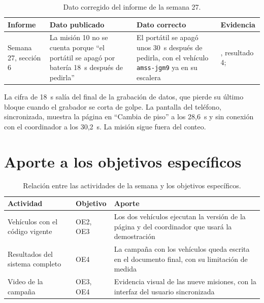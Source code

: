 \documentclass[12pt,letterpaper]{article}
\begin{document}
\begin{table}[H]
\centering
\small
\caption{Dato corregido del informe de la semana 27.}
\begin{tabular}{@{}p{2.2cm}p{4.6cm}p{4.6cm}p{3.2cm}@{}}
\toprule
\textbf{Informe} & \textbf{Dato publicado} & \textbf{Dato correcto} & \textbf{Evidencia} \\ \midrule
Semana 27, sección 6 & La misión 10 no se cuenta porque ``el portátil se apagó por batería 18~s después de pedirla'' & El portátil se apagó unos 30~s después de pedirla, con el vehículo \texttt{amss-jgm9} ya en su escalera & \cite{campana}, resultado 4; \cite{video} \\ \bottomrule
\end{tabular}
\end{table}

La cifra de 18~s salía del final de la grabación de datos, que pierde su último bloque cuando el grabador se corta de golpe. La pantalla del teléfono, sincronizada, muestra la página en ``Cambia de piso'' a los 28,6~s y sin conexión con el coordinador a los 30,2~s. La misión sigue fuera del conteo.

\section{Aporte a los objetivos específicos}

\begin{table}[H]
\centering
\small
\caption{Relación entre las actividades de la semana y los objetivos específicos.}
\begin{tabular}{@{}p{4.4cm}p{1.8cm}p{8.4cm}@{}}
\toprule
\textbf{Actividad} & \textbf{Objetivo} & \textbf{Aporte} \\ \midrule
Vehículos con el código vigente & OE2, OE3 & Los dos vehículos ejecutan la versión de la página y del coordinador que usará la demostración \\
Resultados del sistema completo & OE4 & La campaña con los vehículos queda escrita en el documento final, con su limitación de medida \\
Video de la campaña & OE3, OE4 & Evidencia visual de las nueve misiones, con la interfaz del usuario sincronizada \\ \bottomrule
\end{tabular}
\end{table}
\end{document}
